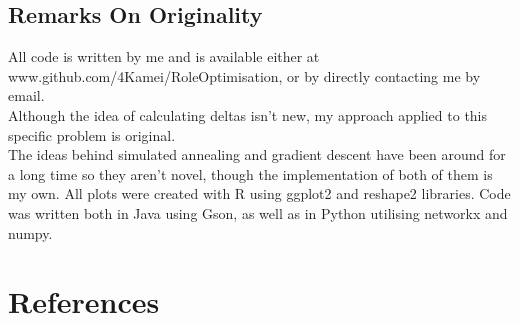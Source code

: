 \documentclass[9pt,twocolumn,twoside,lineno]{pnas-new}
\begin{document}
\subsection*{Remarks On Originality}
All code is written by me and is available either at www.github.com/4Kamei/RoleOptimisation, or by directly contacting me by email. \\ 
Although the idea of calculating deltas isn't new, my approach applied to this specific problem is original. \\ 
The ideas behind simulated annealing and gradient descent have been around for a long time so they aren't novel, though the implementation of both of them is my own.
All plots were created with R using ggplot2 and reshape2 libraries. 
Code was written both in Java using Gson, as well as in Python utilising networkx and numpy. 

\section*{References}


\end{document}
